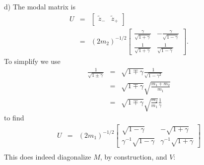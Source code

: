 \documentclass[letterpaper,11pt]{article}
\begin{document}
d) The modal matrix is
\begin{eqnarray*}
 U & = & \left[ \begin{array}{cc} \tilde{z}_- & \tilde{z}_+ \end{array} \right] \\
   & = & (2 m_2)^{-1/2} \left[ \begin{array}{cc}
          \frac{\gamma}{\sqrt{1 + \gamma}} & - \frac{\gamma}{\sqrt{1 - \gamma}} \\
          \frac{1}{\sqrt{1 + \gamma}} & \frac{1}{\sqrt{1 - \gamma}}
         \end{array} \right].
\end{eqnarray*}
To simplify we use
\begin{eqnarray*}
 \frac{1}{\sqrt{1 \pm \gamma}} & = & \sqrt{1 \mp \gamma} \frac{1}{\sqrt{1 - \gamma^2}} \\
 & = & \sqrt{1 \mp \gamma} \sqrt{\frac{m_1 + m_2}{m_1}} \\
 & = & \sqrt{1 \mp \gamma} \sqrt{\frac{m_2}{m_1}} \frac{1}{\gamma}
\end{eqnarray*}
to find
\begin{eqnarray*}
 U & = & (2 m_1)^{-1/2} \left[ \begin{array}{cc}
          \sqrt{1 - \gamma} & - \sqrt{1 + \gamma} \\
          \gamma^{-1} \sqrt{1 - \gamma} & \gamma^{-1} \sqrt{1 + \gamma}
         \end{array} \right] \\
\end{eqnarray*}
This does indeed diagonalize $M$, by construction, and $V$:
\end{document}

